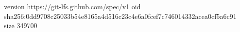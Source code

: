 version https://git-lfs.github.com/spec/v1
oid sha256:0dd9708c25033b54e8165a4d516c23c4e6a0fcef7c746014332acea0cf5a6c91
size 349700

